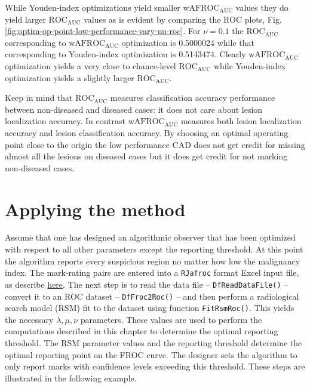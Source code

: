 \documentclass[
]{book}
\begin{document}
While Youden-index optimizations yield smaller \(\text{wAFROC}_\text{AUC}\) values they do yield larger \(\text{ROC}_\text{AUC}\) values as is evident by comparing the ROC plots, Fig. \ref{fig:optim-op-point-low-performance-vary-nu-roc}. For \(\nu=0.1\) the \(\text{ROC}_\text{AUC}\) corresponding to \(\text{wAFROC}_\text{AUC}\) optimization is 0.5000024 while that corresponding to Youden-index optimization is 0.5143474. Clearly \(\text{wAFROC}_\text{AUC}\) optimization yields a very close to chance-level \(\text{ROC}_\text{AUC}\) while Youden-index optimization yields a slightly larger \(\text{ROC}_\text{AUC}\).

Keep in mind that \(\text{ROC}_\text{AUC}\) measures classification accuracy performance between non-diseased and diseased cases: it does not care about lesion localization accuracy. In contrast \(\text{wAFROC}_\text{AUC}\) measures both lesion localization accuracy and lesion classification accuracy. By choosing an optimal operating point close to the origin the low performance CAD does not get credit for missing almost all the lesions on diseased cases but it does get credit for not marking non-diseased cases.

\hypertarget{optim-op-point-how-to-use-method}{%
\section{Applying the method}\label{optim-op-point-how-to-use-method}}

Assume that one has designed an algorithmic observer that has been optimized with respect to all other parameters except the reporting threshold. At this point the algorithm reports every suspicious region no matter how low the malignancy index. The mark-rating pairs are entered into a \texttt{RJafroc} format Excel input file, as describe \href{https://dpc10ster.github.io/RJafrocQuickStart/quick-start-froc-data-format.html}{here}. The next step is to read the data file -- \texttt{DfReadDataFile()} -- convert it to an ROC dataset -- \texttt{DfFroc2Roc()} -- and then perform a radiological search model (RSM) fit to the dataset using function \texttt{FitRsmRoc()}. This yields the necessary \(\lambda, \mu, \nu\) parameters. These values are used to perform the computations described in this chapter to determine the optimal reporting threshold. The RSM parameter values and the reporting threshold determine the optimal reporting point on the FROC curve. The designer sets the algorithm to only report marks with confidence levels exceeding this threshold. These steps are illustrated in the following example.
\end{document}
